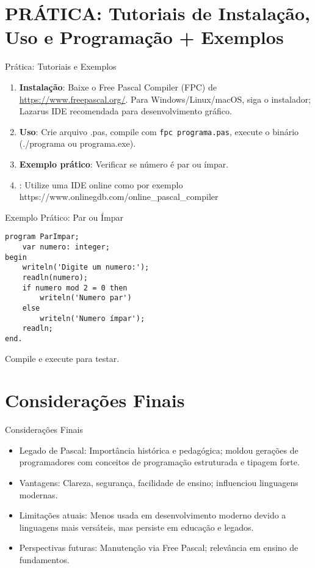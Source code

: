 \documentclass{beamer}
\begin{document}
\section{PRÁTICA: Tutoriais de Instalação, Uso e Programação + Exemplos}
\begin{frame}{Prática: Tutoriais e Exemplos}
\begin{enumerate}
\item \textbf{Instalação}: Baixe o Free Pascal Compiler (FPC) de \url{https://www.freepascal.org/}. Para Windows/Linux/macOS, siga o instalador; Lazarus IDE recomendada para desenvolvimento gráfico.
\item \textbf{Uso}: Crie arquivo .pas, compile com \texttt{fpc programa.pas}, execute o binário (./programa ou programa.exe).
\item \textbf{Exemplo prático}: Verificar se número é par ou ímpar.
\item {}: Utilize uma IDE online como por exemplo https://www.onlinegdb.com/online\_pascal\_compiler
\end{enumerate}
\end{frame}
\begin{frame}[fragile]{Exemplo Prático: Par ou Ímpar}
\begin{lstlisting}
program ParImpar;
    var numero: integer;
begin
    writeln('Digite um numero:');
    readln(numero);
    if numero mod 2 = 0 then
        writeln('Numero par')
    else
        writeln('Numero ímpar');
    readln;
end.
\end{lstlisting}
Compile e execute para testar.
\end{frame}
\section{Considerações Finais}
\begin{frame}{Considerações Finais}
\begin{itemize}
\item Legado de Pascal: Importância histórica e pedagógica; moldou gerações de programadores com conceitos de programação estruturada e tipagem forte.
\item Vantagens: Clareza, segurança, facilidade de ensino; influenciou linguagens modernas.
\item Limitações atuais: Menos usada em desenvolvimento moderno devido a linguagens mais versáteis, mas persiste em educação e legados.
\item Perspectivas futuras: Manutenção via Free Pascal; relevância em ensino de fundamentos.
\end{itemize}
\end{frame}
\end{document}
